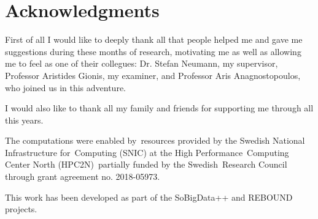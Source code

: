 \section*{Acknowledgments }

First of all I would like to deeply thank all that people helped me and gave me
suggestions during these months of research, motivating me as well as allowing me to
feel as one of their collegues: Dr. Stefan Neumann, my supervisor, Professor
Aristides Gionis, my examiner, and Professor Aris Anagnostopoulos, who joined us in this adventure.

I would also like to thank all my family and friends for supporting me through
all this years.

\bigskip
The computations were enabled by resources provided by the Swedish National Infrastructure for Computing
(SNIC) at the High Performance Computing Center North (HPC2N) partially funded by the Swedish Research Council through grant agreement no. 2018-05973.

This work has been developed as part of the SoBigData++ and REBOUND projects.
\acknowlegmentssignature
